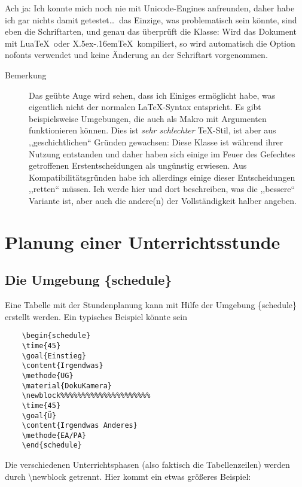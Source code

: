 \documentclass[hyperworksheet]{drcschool}
\newcommand*{\cs}[1]{\textup{\ttfamily\textbackslash#1}}                        %
\newcommand*{\opt}[1]{\textup{\ttfamily#1}}                                     %
\newcommand*{\env}[1]{\textup{\ttfamily\{#1\}}}                                 %
\begin{document}
Ach ja: Ich konnte mich noch nie mit Unicode-Engines anfreunden, daher habe ich
gar nichts damit getestet\ldots\ das Einzige, was problematisch sein könnte,
sind eben die Schriftarten, und genau das überprüft die Klasse: Wird das
Dokument mit Lua\TeX\ oder X\lower.5ex\hbox{}\kern-.16em\TeX\
kompiliert, so wird automatisch die Option \opt{nofonts} verwendet und keine
Änderung an der Schriftart vorgenommen.

\begin{description}
\item[Bemerkung]
Das geübte Auge wird sehen, dass ich Einiges ermöglicht habe, was eigentlich
nicht der normalen \LaTeX-Syntax entspricht. Es gibt beispielsweise Umgebungen, die auch
als Makro mit Argumenten funktionieren können. Dies ist \emph{sehr schlechter} \TeX-Stil,
ist aber aus ,,geschichtlichen`` Gründen gewachsen: Diese Klasse ist während ihrer Nutzung
entstanden und daher haben sich einige im Feuer des Gefechtes getroffenen
Erstentscheidungen als ungünstig erwiesen. Aus Kompatibilitätsgründen habe
ich allerdings einige dieser Entscheidungen ,,retten`` müssen. Ich werde
hier und dort beschreiben, was die ,,bessere`` Variante ist, aber auch die andere(n)
der Vollständigkeit halber angeben.
\end{description}

\section{Planung einer Unterrichtsstunde}
\subsection{Die Umgebung \{schedule\}}
Eine Tabelle mit der Stundenplanung kann mit Hilfe der Umgebung  \env{schedule} erstellt werden.
Ein typisches Beispiel könnte sein
\begin{verbatim}
    \begin{schedule}
    \time{45}
    \goal{Einstieg}
    \content{Irgendwas}
    \methode{UG}
    \material{DokuKamera}
    \newblock%%%%%%%%%%%%%%%%%%%%%
    \time{45}
    \goal{Ü}
    \content{Irgendwas Anderes}
    \methode{EA/PA}
    \end{schedule}
\end{verbatim}
Die verschiedenen Unterrichtsphasen (also faktisch die Tabellenzeilen) werden durch \cs{newblock}
getrennt. Hier kommt ein etwas größeres Beispiel:

\end{document}
